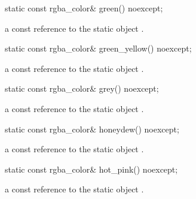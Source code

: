 \begin{itemdecl}
    static const rgba_color& green() noexcept;
\end{itemdecl}
\begin{itemdescr}
    \pnum
    \returns
    a const reference to the static  object .
\end{itemdescr}

\begin{itemdecl}
    static const rgba_color& green_yellow() noexcept;
\end{itemdecl}
\begin{itemdescr}
    \pnum
    \returns
    a const reference to the static  object .
\end{itemdescr}

\begin{itemdecl}
    static const rgba_color& grey() noexcept;
\end{itemdecl}
\begin{itemdescr}
    \pnum
    \returns
    a const reference to the static  object .
\end{itemdescr}

\begin{itemdecl}
    static const rgba_color& honeydew() noexcept;
\end{itemdecl}
\begin{itemdescr}
    \pnum
    \returns
    a const reference to the static  object .
\end{itemdescr}

\begin{itemdecl}
    static const rgba_color& hot_pink() noexcept;
\end{itemdecl}
\begin{itemdescr}
    \pnum
    \returns
    a const reference to the static  object .
\end{itemdescr}

